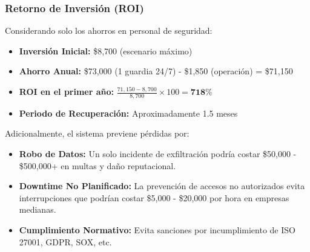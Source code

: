 \documentclass[12pt, a4paper]{article}
\begin{document}
\begin{itemize}
\subsubsection{Retorno de Inversión (ROI)}
Considerando solo los ahorros en personal de seguridad:
\begin{itemize}
\item \textbf{Inversión Inicial:} \$8,700 (escenario máximo)
\item \textbf{Ahorro Anual:} \$73,000 (1 guardia 24/7) - \$1,850 (operación) = \$71,150
\item \textbf{ROI en el primer año:} $\frac{71,150 - 8,700}{8,700} \times 100 = \mathbf{718\%}$
\item \textbf{Periodo de Recuperación:} Aproximadamente 1.5 meses
\end{itemize}

Adicionalmente, el sistema previene pérdidas por:
\begin{itemize}
\item \textbf{Robo de Datos:} Un solo incidente de exfiltración podría costar \$50,000 - \$500,000+ en multas y daño reputacional.
\item \textbf{Downtime No Planificado:} La prevención de accesos no autorizados evita interrupciones que podrían costar \$5,000 - \$20,000 por hora en empresas medianas.
\item \textbf{Cumplimiento Normativo:} Evita sanciones por incumplimiento de ISO 27001, GDPR, SOX, etc.
\end{itemize}

\begin{figure}[H]
\centering
{}
\end{figure}
\end{itemize}
\end{document}
